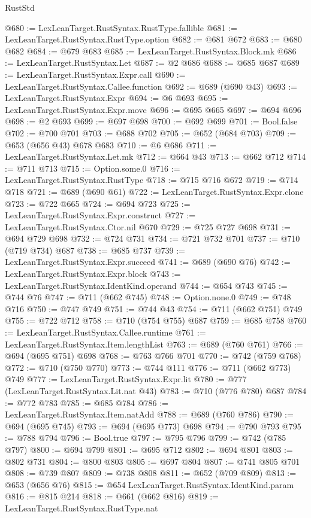 \begin{lexlean}{RustStd}
\begin{coremodule}
{\begin{coremodule}
{{{{{{{{{{{{{{{{{{{{@680 := LexLeanTarget.RustSyntax.RustType.fallible
@681 := LexLeanTarget.RustSyntax.RustType.option
@682 := @681 @672
@683 := @680 @682
@684 := @679 @683
@685 := LexLeanTarget.RustSyntax.Block.mk
@686 := LexLeanTarget.RustSyntax.Let
@687 := @2 @686
@688 := @685 @687
@689 := LexLeanTarget.RustSyntax.Expr.call
@690 := LexLeanTarget.RustSyntax.Callee.function
@692 := @689 (@690 @43)
@693 := LexLeanTarget.RustSyntax.Expr
@694 := @6 @693
@695 := LexLeanTarget.RustSyntax.Expr.move
@696 := @695 @665
@697 := @694 @696
@698 := @2 @693
@699 := @697 @698
@700 := @692 @699
@701 := Bool.false
@702 := @700 @701
@703 := @688 @702
@705 := @652 (@684 @703)
@709 := @653 (@656 @43) @678 @683
@710 := @6 @686
@711 := LexLeanTarget.RustSyntax.Let.mk
@712 := @664 @43
@713 := @662 @712
@714 := @711 @713
@715 := Option.some.{0}
@716 := LexLeanTarget.RustSyntax.RustType
@718 := @715 @716 @672
@719 := @714 @718
@721 := @689 (@690 @61)
@722 := LexLeanTarget.RustSyntax.Expr.clone
@723 := @722 @665
@724 := @694 @723
@725 := LexLeanTarget.RustSyntax.Expr.construct
@727 := LexLeanTarget.RustSyntax.Ctor.nil @670
@729 := @725 @727 @698
@731 := @694 @729 @698
@732 := @724 @731
@734 := @721 @732 @701
@737 := @710 (@719 @734) @687
@738 := @685 @737
@739 := LexLeanTarget.RustSyntax.Expr.succeed
@741 := @689 (@690 @76)
@742 := LexLeanTarget.RustSyntax.Expr.block
@743 := LexLeanTarget.RustSyntax.IdentKind.operand
@744 := @654 @743
@745 := @744 @76
@747 := @711 (@662 @745)
@748 := Option.none.{0}
@749 := @748 @716
@750 := @747 @749
@751 := @744 @43
@754 := @711 (@662 @751) @749
@755 := @722 @712
@758 := @710 (@754 @755) @687
@759 := @685 @758
@760 := LexLeanTarget.RustSyntax.Callee.runtime
@761 := LexLeanTarget.RustSyntax.Item.lengthList
@763 := @689 (@760 @761)
@766 := @694 (@695 @751) @698
@768 := @763 @766 @701
@770 := @742 (@759 @768)
@772 := @710 (@750 @770)
@773 := @744 @111
@776 := @711 (@662 @773) @749
@777 := LexLeanTarget.RustSyntax.Expr.lit
@780 := @777 (LexLeanTarget.RustSyntax.Lit.nat @43)
@783 := @710 (@776 @780) @687
@784 := @772 @783
@785 := @685 @784
@786 := LexLeanTarget.RustSyntax.Item.natAdd
@788 := @689 (@760 @786)
@790 := @694 (@695 @745)
@793 := @694 (@695 @773) @698
@794 := @790 @793
@795 := @788 @794
@796 := Bool.true
@797 := @795 @796
@799 := @742 (@785 @797)
@800 := @694 @799
@801 := @695 @712
@802 := @694 @801
@803 := @802 @731
@804 := @800 @803
@805 := @697 @804
@807 := @741 @805 @701
@808 := @739 @807
@809 := @738 @808
@811 := @652 (@709 @809)
@813 := @653 (@656 @76)
@815 := @654 LexLeanTarget.RustSyntax.IdentKind.param
@816 := @815 @214
@818 := @661 (@662 @816)
@819 := LexLeanTarget.RustSyntax.RustType.nat
}}}}}}}}}}}}}}}}}}}}
\end{coremodule}}
\end{coremodule}
\end{lexlean}
